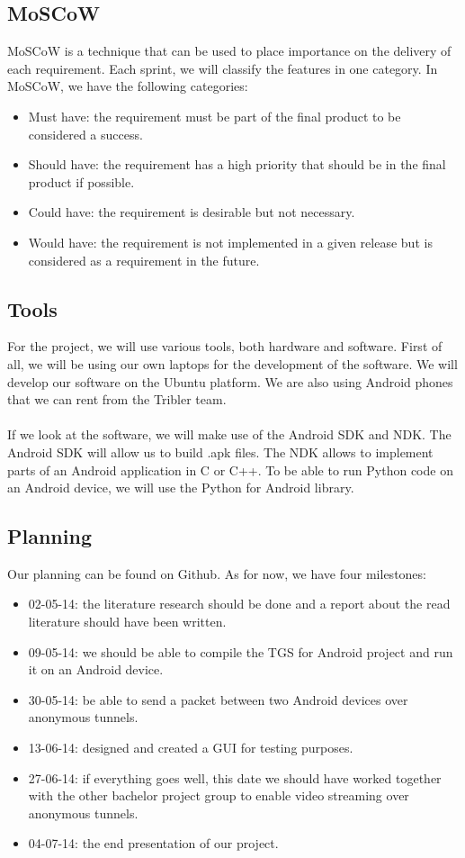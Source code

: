 \subsection{MoSCoW}
MoSCoW is a technique that can be used to place importance on the delivery of each requirement. Each sprint, we will classify the features in one category. In MoSCoW, we have the following categories:
\begin{itemize}
\item Must have: the requirement must be part of the final product to be considered a success.
\item Should have: the requirement has a high priority that should be in the final product if possible.
\item Could have: the requirement is desirable but not necessary.
\item Would have: the requirement is not implemented in a given release but is considered as a requirement in the future.
\end{itemize}

\subsection{Tools}
For the project, we will use various tools, both hardware and software. First of all, we will be using our own laptops for the development of the software. We will develop our software on the Ubuntu platform. We are also using Android phones that we can rent from the Tribler team.\\\\
If we look at the software, we will make use of the Android SDK and NDK. The Android SDK will allow us to build .apk files. The NDK allows to implement parts of an Android application in C or C++. To be able to run Python code on an Android device, we will use the Python for Android library.

\subsection{Planning}
Our planning can be found on Github. As for now, we have four milestones:
\begin{itemize}
\item 02-05-14: the literature research should be done and a report about the read literature should have been written.
\item 09-05-14: we should be able to compile the TGS for Android project and run it on an Android device.
\item 30-05-14: be able to send a packet between two Android devices over anonymous tunnels.
\item 13-06-14: designed and created a GUI for testing purposes.
\item 27-06-14: if everything goes well, this date we should have worked together with the other bachelor project group to enable video streaming over anonymous tunnels.
\item 04-07-14: the end presentation of our project.
\end{itemize}

